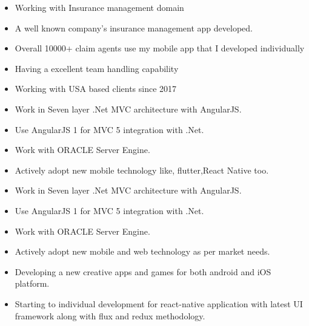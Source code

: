 \documentclass[10pt,a4paper]{altacv}
\begin{document}
\begin{itemize}
\item Working with Insurance management domain
\item A well known company's insurance management app developed.
\item Overall 10000+ claim agents use my mobile app that I developed individually
\item Having a excellent team handling capability 
\item Working with USA based clients since 2017
\end{itemize}
\begin{itemize}
\item Work in Seven layer .Net MVC architecture with AngularJS.
\item Use AngularJS 1 for MVC 5 integration with .Net.
\item Work with ORACLE Server Engine.
\item Actively adopt new mobile technology like, flutter,React Native too.
\end{itemize}
\begin{itemize}
\item Work in Seven layer .Net MVC architecture with AngularJS.
\item Use AngularJS 1 for MVC 5 integration with .Net.
\item Work with ORACLE Server Engine.
\item Actively adopt new mobile and web technology as per market needs.
\end{itemize}
\begin{itemize}
\item Developing a new creative apps and games for both android and iOS platform.
\item Starting to individual development for react-native application with latest UI framework along with flux and redux methodology.
\end{itemize}



\end{document}
